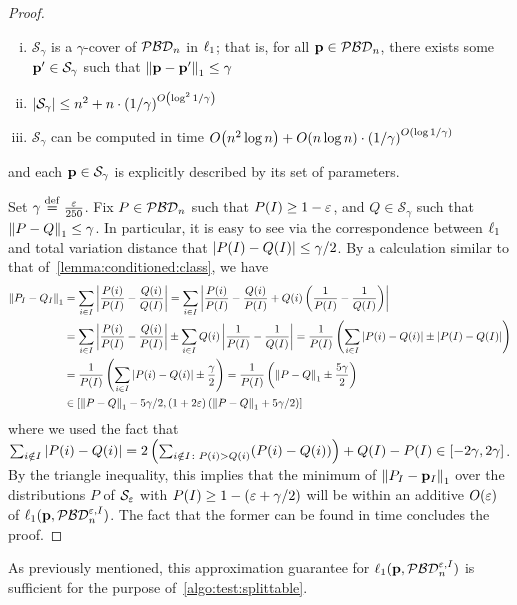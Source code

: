 \begin{proof}
\begin{theorem}[{\cite[Theorem 1]{DP:13}}]
\begin{enumerate}[(i)]
  \item $\mathcal{S}_{\gamma}$ is a $\gamma$-cover of $\classpbd[n]$ in $\lp[1]$; that is, for all $\D \in \classpbd[n]$, there exists some $\D^\prime \in \mathcal{S}_{\gamma}$ such that $\normone{\D-\D^\prime} \leq \gamma$
  \item {$\abs{\mathcal{S}_{\gamma}} \le n^2 + n \cdot \left({1/\gamma}\right)^{\bigO{ \log^2{1/\gamma}}}$}
  \item $\mathcal{S}_{\gamma}$ can be computed in time {$\bigO{ n^2 \log n} + \bigO{n \log n} \cdot \left( {1/\gamma} \right)^{\bigO{\log{1/\gamma}}}$}
  \end{enumerate}
and each $\D\in\mathcal{S}_{\gamma}$  is explicitly described by its set of parameters.
\end{theorem}
\fi

Set $\gamma\eqdef\frac{\eps}{250}$. Fix $P\in\classpbd[n]$ such that $P(I) \geq 1-\eps$, and $Q\in \mathcal{S}_{\gamma}$ such that $\normone{P-Q}\leq \gamma$. In particular, it is easy to see via the correspondence between $\lp[1]$ and total variation distance that $\abs{P(I)-Q(I)} \leq \gamma/2$.
By a calculation similar to that of~\cref{lemma:conditioned:class}, we have 
\begin{align*}
  \normone{P_I-Q_I} &= \sum_{i\in I}\abs{\frac{P(i)}{P(I)} - \frac{Q(i)}{Q(I)}} 
  = \sum_{i\in I}\abs{\frac{P(i)}{P(I)} - \frac{Q(i)}{P(I)} + Q(i)\left( \frac{1}{P(I)} - \frac{1}{Q(I)} \right) } \\
  &= \sum_{i\in I}\abs{\frac{P(i)}{P(I)} - \frac{Q(i)}{P(I)} } \pm \sum_{i\in I} Q(i)\abs{ \frac{1}{P(I)} - \frac{1}{Q(I)} }
  = \frac{1}{P(I)}\left( \sum_{i\in I}\abs{ P(i) - Q(i) } \pm \abs{P(I)-Q(I)}\right) \\
  &= \frac{1}{P(I)}\left( \sum_{i\in I}\abs{ P(i) - Q(i) } \pm \frac{\gamma}{2}\right) = \frac{1}{P(I)}\left( \normone{ P - Q } \pm \frac{5\gamma}{2}\right) \\
  &\in [ \normone{ P - Q } - {5\gamma}/{2}, (1+2\eps)\left( \normone{ P - Q } + {5\gamma}/{2} \right) ]
  \end{align*}
where we used the fact that $\sum_{i\notin I}\abs{ P(i) - Q(i) } = 2\left(\sum_{i\notin I\colon P(i) > Q(i)} (P(i)-Q(i))\right) + Q(I)-P(I) \in [-2\gamma,2\gamma]$.
By the triangle inequality, this implies that the minimum of $\normone{P_I-\D_I}$ over the distributions $P$ of $\mathcal{S}_\eps$ with $P(I)\geq 1-(\eps+\gamma/2)$ will be within an additive $\bigO{\eps}$ of $\lp[1](\D,\classpbd[n]^{\eps,I})$. The fact that the former can be found  in time  concludes the proof.
\end{proof}
As previously mentioned, this approximation guarantee for $\lp[1](\D,\classpbd[n]^{\eps,I})$ is sufficient for the purpose of~\cref{algo:test:splittable}.

